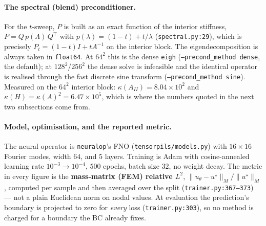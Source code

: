 \documentclass[11pt]{article}
\newcommand{\Ainv}{A^{-1}}
\begin{document}
\paragraph{The spectral (blend) preconditioner.}
For the $t$-sweep, $P$ is built as an exact function of the interior stiffness,
$P = Q\,p(\Lambda)\,Q^\top$ with $p(\lambda) = (1-t) + t/\lambda$
(\texttt{spectral.py:29}), which is precisely $P_t = (1-t)I + t\Ainv$ on the interior block. The
eigendecomposition is always taken in \texttt{float64}. At $64^2$ this is the dense
\texttt{eigh} (\texttt{--precond\_method dense}, the default); at $128^2$/$256^2$ the dense solve is
infeasible and the identical operator is realised through the fast discrete sine transform
(\texttt{--precond\_method sine}). Measured on the $64^2$ interior block: $\kappa(A_{II}) = 8.04\times 10^{2}$
and $\kappa(H) = \kappa(A)^2 = 6.47\times 10^{5}$, which is where the numbers quoted in the next
two subsections come from.

\paragraph{Model, optimisation, and the reported metric.}
The neural operator is \texttt{neuralop}'s FNO (\texttt{tensorpils/models.py}) with
$16\times 16$ Fourier modes, width $64$, and $5$ layers. Training is Adam with cosine-annealed
learning rate $10^{-3} \to 10^{-4}$, $500$ epochs, batch size $32$, no weight decay. The metric in
every figure is the \textbf{mass-matrix (FEM) relative $L^2$},
$\|u_\theta - u^\star\|_M / \|u^\star\|_M$, computed per sample and then averaged over the split
(\texttt{trainer.py:367--373}) --- not a plain Euclidean norm on nodal values. At evaluation the
prediction's boundary is projected to zero for \emph{every} loss (\texttt{trainer.py:303}), so no
method is charged for a boundary the BC already fixes.
\end{document}
